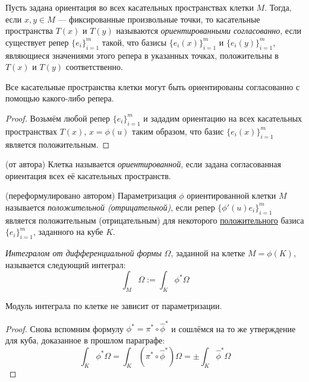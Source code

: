 \begin{definition}
	Пусть задана ориентация во всех касательных пространствах клетки $M$. Тогда, если $x, y \in M$ --- фиксированные произвольные точки, то касательные пространства $T(x)$ и $T(y)$ называются \textit{ориентированными согласованно}, если существует репер $\{e_i\}_{i = 1}^m$ такой, что базисы $\{e_i(x)\}_{i = 1}^m$ и $\{e_i(y)\}_{i = 1}^m$, являющиеся значениями этого репера в указанных точках, положительны в $T(x)$ и $T(y)$ соответственно.
\end{definition}

\begin{proposition}
	Все касательные пространства клетки могут быть ориентированы согласованно с помощью какого-либо репера.
\end{proposition}

\begin{proof}
	Возьмём любой репер $\{e_i\}_{i = 1}^m$ и зададим ориентацию на всех касательных пространствах $T(x)$, $x = \phi(u)$ таким образом, что базис $\{e_i(x)\}_{i = 1}^m$ является положительным.
\end{proof}

\begin{definition} (от автора)
	Клетка называется \textit{ориентированной}, если задана согласованная ориентация всех её касательных пространств.
\end{definition}

\begin{definition} (переформулировано автором)
	Параметризация $\phi$ ориентированной клетки $M$ называется \textit{положительной (отрицательной)}, если репер $\{\phi'(u)e_i\}_{i = 1}^m$ является положительным (отрицательным) для некоторого \underline{положительного} базиса $\{e_i\}_{i = 1}^m$, заданного на кубе $K$.
\end{definition}

\begin{definition}
	\textit{Интегралом от дифференциальной формы} $\Omega$, заданной на клетке $M = \phi(K)$, называется следующий интеграл:
	\[
		\int_M \Omega := \int_K \phi^*\Omega
	\]
\end{definition}

\begin{proposition}
	Модуль интеграла по клетке не зависит от параметризации.
\end{proposition}

\begin{proof}
	Снова вспомним формулу $\phi^* = \pi^* \circ \hat{\phi}^*$ и сошлёмся на то же утверждение для куба, доказанное в прошлом параграфе:
	\[
		\int_K \phi^*\Omega = \int_K (\pi^* \circ \hat{\phi}^*)\Omega = \pm \int_K \hat{\phi}^*\Omega
	\]
\end{proof}

